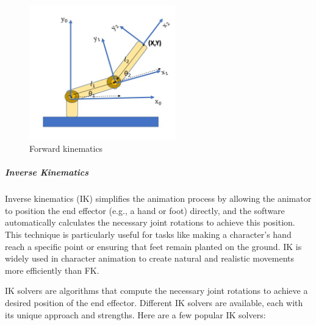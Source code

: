 \documentclass[../../main.tex]{subfiles}
\begin{document}
\begin{figure} 
  \centering \includegraphics[width = 2.5in]{chapters/background_work/images/forward_kinematics_example.png} 
  \caption{Forward kinematics} 
  \label{fig:forward_kinematics_example} 
\end{figure}

\subparagraph{Inverse Kinematics}
\label{ch:background_work:sign_language_synthesis:3d_techniques:avatar_animation:kinematics:inverse_kinematics}

Inverse kinematics (IK) simplifies the animation process by allowing the animator to position the end effector (e.g., a hand or foot) directly, and the software automatically calculates the necessary joint rotations to achieve this position. This technique is particularly useful for tasks like making a character’s hand reach a specific point or ensuring that feet remain planted on the ground. IK is widely used in character animation to create natural and realistic movements more efficiently than FK.

IK solvers are algorithms that compute the necessary joint rotations to achieve a desired position of the end effector. Different IK solvers are available, each with its unique approach and strengths. Here are a few popular IK solvers:
\end{document}
